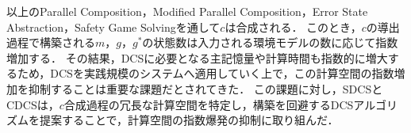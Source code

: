以上のParallel Composition，Modified Parallel Composition，Error State Abstraction，Safety Game Solvingを通して$c$は合成される．
このとき，$c$の導出過程で構築される$m$，$g$，$g^*$の状態数は入力される環境モデルの数に応じて指数増加する．
その結果，DCSに必要となる主記憶量や計算時間も指数的に増大するため，DCSを実践規模のシステムへ適用していく上で，この計算空間の指数増加を抑制することは重要な課題だとされてきた\cite{paper:DirectedControllerSyntehsis}\cite{aizawa:IEICEJ2020}\cite{aizawa:SmartWorld}．
この課題に対し，SDCS\cite{yamauchi:IEICEJ2023}とCDCS\cite{yamauchi:IPSJ2024}は，$c$合成過程の冗長な計算空間を特定し，構築を回避するDCSアルゴリズムを提案することで，計算空間の指数爆発の抑制に取り組んだ．


